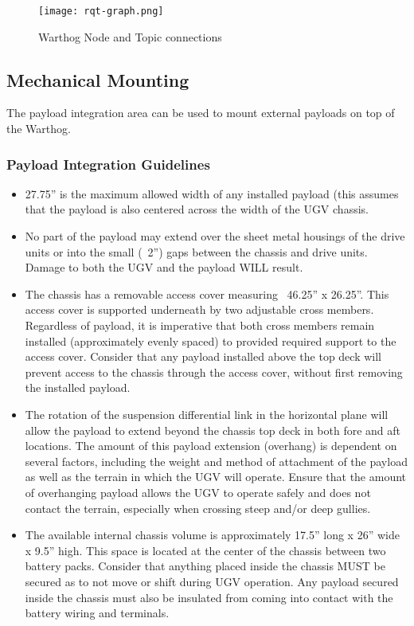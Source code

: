 \documentclass[]{clearpath-latex/clearpath-manual}
\begin{document}
\begin{figure}[!htb]
  \centering
  \texttt{[image: rqt-graph.png]}
  \caption{Warthog Node and Topic connections}
  \label{fig:rqt-graph}
\end{figure}
\clearpage

\pagebreak[4]
\subsection{Mechanical Mounting}
\label{mechanical}

The payload integration area can be used to mount external payloads on top of the Warthog.


\subsubsection{Payload Integration Guidelines}

\begin{itemize}[nolistsep]

\item 27.75” is the maximum allowed width of any installed payload (this assumes that the payload is also centered across the width of the UGV chassis.

\item  No part of the payload may extend over the sheet metal housings of the drive units or into the small (~2”) gaps between the chassis and drive units. Damage to both the UGV and the payload WILL result.

\item  The chassis has a removable access cover measuring ~46.25” x 26.25”. This access cover is supported underneath by two adjustable cross members. Regardless of payload, it is imperative that both cross members remain installed (approximately evenly spaced) to provided required support to the access cover. Consider that any payload installed above the top deck will prevent access to the chassis through the access cover, without first removing the installed payload.

\item  The rotation of the suspension differential link in the horizontal plane will allow the payload to extend beyond the chassis top deck in both fore and aft locations. The amount of this payload extension (overhang) is dependent on several factors, including the weight and method of attachment of the payload as well as the terrain in which the UGV will operate. Ensure that the amount of overhanging payload allows the UGV to operate safely and does not contact the terrain, especially when crossing steep and/or deep gullies.

\item  The available internal chassis volume is approximately 17.5” long x 26” wide x 9.5” high. This space is located at the center of the chassis between two battery packs. Consider that anything placed inside the chassis MUST be secured as to not move or shift during UGV operation. Any payload secured inside the chassis must also be insulated from coming into contact with the battery wiring and terminals.

\end{itemize}
\end{document}
